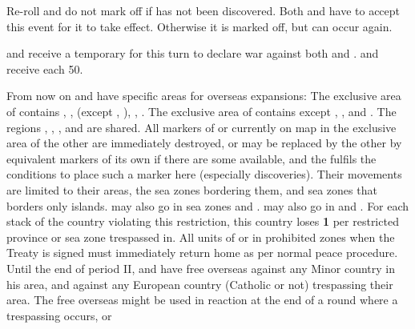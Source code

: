 \newpage\startevents





\condition{}
\aparag Re-roll and do not mark off if \continentAmerica has not been
discovered.
\aparag Both \SPA and \POR have to accept this event for it to take
effect. Otherwise it is marked off, but can occur again.

\phevnt
\aparag \FRA and \ENG receive a temporary \CB for this turn to declare war
against both \SPA and \POR.
\aparag \SPA and \POR receive each 50\ducats.

\effetlong
\aparag From now on \SPA and \POR have specific areas for overseas expansions:
\bparag The exclusive area of \POR contains ,
\continentSiberia, \continentAsia (except \granderegionPhilippines,
), \continentAfrica, \continentBrazil.
\bparag The exclusive area of \SPA contains \continentAmerica except
\continentBrazil, \granderegionAmazonia, and .
\bparag The regions \granderegionAmazonia, ,
\granderegionPhilippines, and  are shared.
\bparag All markers of \SPA or \POR currently on map in the exclusive area of
the other \MAJ are immediately destroyed, or may be replaced by the other \MAJ
by equivalent markers of its own if there are some available, and the \MAJ
fulfils the conditions to place such a marker here (especially discoveries).
\bparag Their movements are limited to their areas, the sea zones bordering
them, and sea zones that borders only islands. \POR may also go in sea zones
 and . \SPA may also go in
 and .
\bparag For each stack of the country violating this restriction, this country
loses {\bf 1} \STAB per restricted province or sea zone trespassed in. All
units of \SPA or \POR in prohibited zones when the Treaty is signed must
immediately return home as per normal peace procedure.
\bparag Until the end of period II, \SPA and \POR have free overseas
 against any Minor country in his area, and against any European
country (Catholic or not) trespassing their area. The free overseas 
might be used in reaction at the end of a round where a trespassing occurs, or
